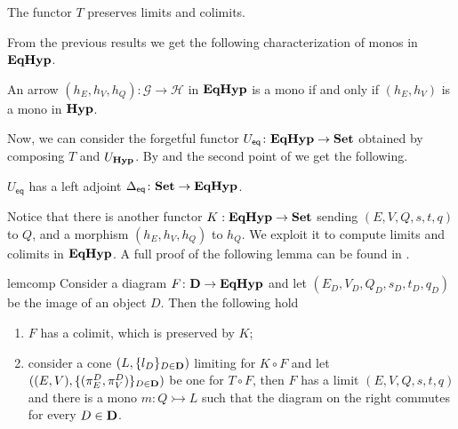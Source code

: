\documentclass[3p]{elsarticle}
\newcommand{\eq}{\mathsf{eq}}
\newcommand{\Set}{\mathbf{Set}}
\def\D{\textbf {\textup{D}}}
\newcommand{\catname}[1]{\textbf{\textup{#1}}}
\newcommand{\hyp}{\catname{Hyp}}
\newcommand{\EqHyp}{\catname{EqHyp}} %
\newcommand{\mto}{\rightarrowtail}
\theoremstyle{remark}
\theoremstyle{definition}
\begin{document}
\begin{cor}\label{cor:limcolim}
	The functor $T$ preserves limits and colimits.
\end{cor}

From the previous results we get the following characterization of monos in $\EqHyp$.

\begin{cor}\label{cor:mono1}
	An arrow $(h_E, h_V, h_Q): \mathcal{G \to H}$ in $\EqHyp$ is a mono if and only if $(h_E, h_V)$ is a mono in $\hyp$.
\end{cor}

Now, we can consider the forgetful functor $U_{\eq}\colon \EqHyp\to \Set$ obtained by composing $T$ and $U_{\hyp}$.  By  and the second point of  we get the following.

\begin{cor}\label{cor:ladj}
	$U_{\eq}$ has a left adjoint $\Delta_{\eq}\colon \Set \to \EqHyp$.
\end{cor}

Notice that there is another functor $K: \EqHyp \to \Set$ sending $(E, V, Q, s, t, q)$ to $Q$, and a morphism $(h_E, h_V, h_Q)$ to $h_Q$. We  exploit it to compute limits and colimits in $\EqHyp$. A full proof of the following lemma can be found in .

\noindent
\begin{minipage}[l]{.83\linewidth}
	\begin{restatable}{lem}{comp}\label{prop:eqhyp_complete}
		Consider a diagram $F\colon \D \to \EqHyp$ and let $(E_D, V_D, Q_D, s_D, t_D, q_D)$ be the image of an object $D$. Then the following hold
		\begin{enumerate}
			\item $F$ has a colimit, which is preserved by $K$;
			\item consider a cone $(L, \{l_D\}_{D\in \D})$ limiting  for $K \circ F$ and let $((E, V), \{(\pi^D_E, \pi^D_V)\}_{D\in \D})$ be one for $T\circ F$, then $F$ has a limit $(E, V, Q, s, t, q)$ and there is a mono $m\colon Q\mto L$ such that the diagram on the right commutes for every $D\in \D$.
		\end{enumerate}
	\end{restatable}
\end{minipage}\hfill
\begin{minipage}[r]{.15\linewidth}
\end{minipage} 
  
\end{document}
